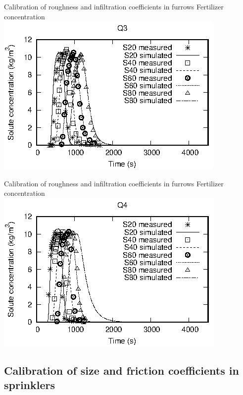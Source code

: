 \documentclass[10pt]{beamer}
\begin{document}
\begin{frame}{Calibration of roughness and infiltration coefficients in furrows}
{Fertilizer concentration}
	\includegraphics[width=\textwidth]{surcos-solute-q3.eps}
\end{frame}

\begin{frame}{Calibration of roughness and infiltration coefficients in furrows}
{Fertilizer concentration}
	\includegraphics[width=\textwidth]{surcos-solute-q4.eps}
\end{frame}

\subsection{Calibration of size and friction coefficients in sprinklers}
\end{document}
